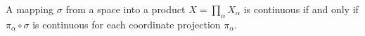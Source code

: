 A mapping $\sigma$ from a space into a product $X = \prod_{\alpha} X_{\alpha}$ is continuous if and only if $\pi_{\alpha} \circ \sigma$ is continuous for each coordinate projection $\pi_{\alpha}$.
